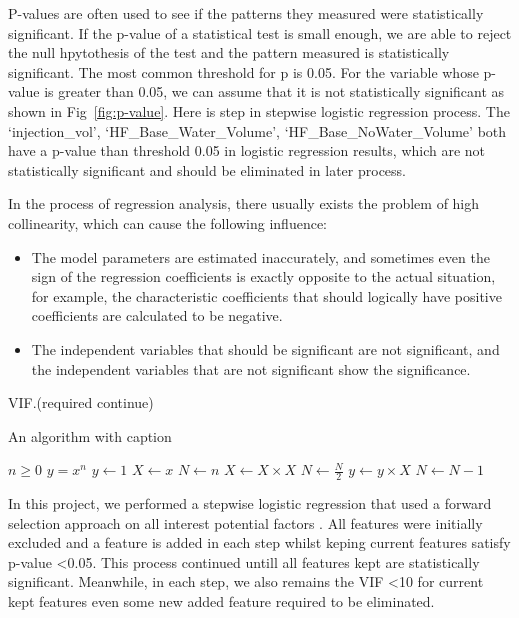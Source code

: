 \documentclass[final-report]{report-template}
\begin{document}
P-values are often used to see if the patterns they measured were statistically significant. If the p-value of a statistical test is small enough, we are able to reject the null hpytothesis of the test and the pattern measured is statistically significant.
The most common threshold for p is 0.05. For the variable whose p-value is greater than 0.05, we can assume that it is not statistically significant as shown in Fig~\ref{fig:p-value}. Here is step in stepwise logistic regression process.
The `injection\_vol', `HF\_Base\_Water\_Volume', `HF\_Base\_NoWater\_Volume' both have a p-value than threshold 0.05 in logistic regression results, which are not statistically significant and should be eliminated in later process.

In the process of regression analysis, there usually exists the problem of high collinearity, which can cause the following influence:
\begin{itemize}
    \item The model parameters are estimated inaccurately, and sometimes even the sign of the regression coefficients is exactly opposite to the actual situation, for example, the characteristic coefficients that should logically have positive coefficients are calculated to be negative.
    \item The independent variables that should be significant are not significant, and the independent variables that are not significant show the significance.
\end{itemize}

VIF.(required continue)


\begin{algorithm}
    \caption{An algorithm with caption}\label{alg:cap}
    \begin{algorithmic}
    \Require $n \geq 0$
    \Ensure $y = x^n$
    \State $y \gets 1$
    \State $X \gets x$
    \State $N \gets n$
        \State $X \gets X \times X$
        \State $N \gets \frac{N}{2}$  
        \State $y \gets y \times X$
        \State $N \gets N - 1$
    \EndIf
    \EndWhile
    \end{algorithmic}
    \end{algorithm}

In this project, we performed a stepwise logistic regression that used a forward selection approach on all interest potential factors \citep{Ryan}.
All features were initially excluded and a feature is added in each step whilst keping current features satisfy p-value \textless 0.05. 
This process continued untill all features kept are statistically significant. Meanwhile, in each step, we also remains the VIF \textless 10 for current kept features even some new added feature required to be eliminated.
\end{document}
